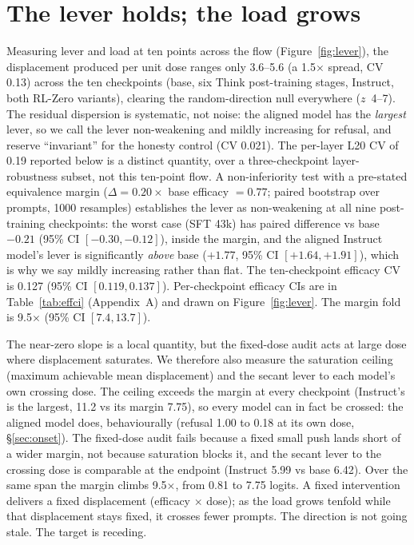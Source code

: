 \documentclass{article}
\newcommand{\x}{$\times$}
\begin{document}
\section{The lever holds; the load grows}\label{sec:lever}
Measuring lever and load at ten points across the flow (Figure~\ref{fig:lever}), the displacement
produced per unit dose ranges only \num{3.6}--\num{5.6} (a \num{1.5}\x{} spread, CV \num{0.13}) across the
ten checkpoints (base, six Think post-training stages, Instruct, both RL-Zero variants), clearing the
random-direction null everywhere ($z$~4--7). The residual dispersion is systematic, not noise: the
aligned model has the \emph{largest} lever, so we call the lever non-weakening and mildly increasing
for refusal, and reserve ``invariant'' for the honesty control (CV \num{0.021}). The per-layer L20 CV
of \num{0.19} reported below is a distinct quantity, over a three-checkpoint layer-robustness subset,
not this ten-point flow.
A non-inferiority test with a pre-stated equivalence margin ($\Delta = 0.20\times$ base efficacy $= 0.77$;
paired bootstrap over prompts, 1000 resamples) establishes the lever as non-weakening at all nine
post-training checkpoints: the worst case (SFT 43k) has paired difference vs base $-0.21$
(95\% CI $[-0.30, -0.12]$), inside the margin, and the aligned Instruct model's lever is significantly
\emph{above} base ($+1.77$, 95\% CI $[+1.64, +1.91]$), which is why we say mildly increasing rather than
flat. The ten-checkpoint efficacy CV is \num{0.127} (95\% CI $[0.119, 0.137]$). Per-checkpoint efficacy
CIs are in Table~\ref{tab:effci} (Appendix~A) and drawn on Figure~\ref{fig:lever}. The margin fold is \num{9.5}\x{} (95\% CI $[7.4, 13.7]$).

The near-zero slope is a local quantity, but the fixed-dose audit acts at large dose where displacement saturates. We therefore also measure the saturation ceiling (maximum achievable mean displacement) and the secant lever to each model's own crossing dose. The ceiling exceeds the margin at every checkpoint (Instruct's is the largest, \num{11.2} vs its margin \num{7.75}), so every model can in fact be crossed: the aligned model does, behaviourally (refusal \num{1.00} to \num{0.18} at its own dose, \S\ref{sec:onset}). The fixed-dose audit fails because a fixed small push lands short of a wider margin, not because saturation blocks it, and the secant lever to the crossing dose is comparable at the endpoint (Instruct \num{5.99} vs base \num{6.42}). Over the same span the margin climbs \num{9.5}\x, from \num{0.81} to
\num{7.75} logits. A fixed intervention delivers a fixed displacement (efficacy $\times$ dose); as
the load grows tenfold while that displacement stays fixed, it crosses fewer prompts. The direction
is not going stale. The target is receding.
\end{document}

